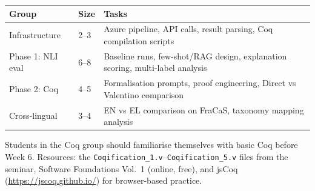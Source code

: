 \documentclass[11pt,a4paper]{article}
\begin{document}
\begin{table}[h!]
\centering\small
\begin{tabularx}{\textwidth}{l l X}
\toprule
\textbf{Group} & \textbf{Size} & \textbf{Tasks} \\
\midrule
Infrastructure & 2--3 & Azure pipeline, API calls, result parsing, Coq compilation scripts \\
Phase 1: NLI eval & 6--8 & Baseline runs, few-shot/RAG design, explanation scoring, multi-label analysis \\
Phase 2: Coq & 4--5 & Formalisation prompts, proof engineering, Direct vs Valentino comparison \\
Cross-lingual & 3--4 & EN vs EL comparison on FraCaS, taxonomy mapping analysis \\
\bottomrule
\end{tabularx}
\end{table}

Students in the Coq group should familiarise themselves with basic Coq before Week 6. Resources: the \texttt{Coqification\_1.v}--\texttt{Coqification\_5.v} files from the seminar, Software Foundations Vol.\ 1 (online, free), and jsCoq (\url{https://jscoq.github.io/}) for browser-based practice.
\end{document}
